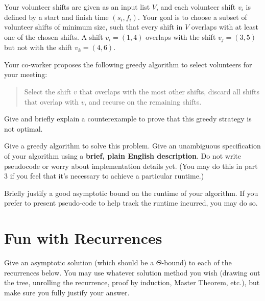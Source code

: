 \documentclass[11pt,fleqn]{exam}
\newif\ifsolutions\solutionsfalse
\begin{document}
Your volunteer shifts are given as an input list $V$, and each volunteer shift $v_i$ is defined by a start and finish time $(s_i, f_i)$. Your goal is to choose a subset of volunteer shifts of minimum size, such that every shift in $V$ overlaps with at least one of the chosen shifts. A shift $v_i=(1,4)$ overlaps with the shift $v_j=(3,5)$ but not with the shift $v_k=(4,6)$. 

\begin{questions}
\question[2] Your co-worker proposes the following greedy algorithm to select volunteers for your meeting:
\begin{quote}
    Select the shift $v$ that overlaps with the most other shifts, discard all shifts that overlap with $v$, and recurse on the remaining shifts.
\end{quote}
Give and briefly explain a counterexample to prove that this greedy strategy is not optimal.

\ifsolutions\fi 

\question[3] Give a greedy algorithm to solve this problem. Give an unambiguous specification of your algorithm using  a \textbf{brief, plain English description}. Do not write pseudocode or worry about implementation details yet. (You may do this in part 3 if you feel that it's necessary to achieve a particular runtime.)

\ifsolutions\fi 

\question[4] Briefly justify a good asymptotic bound on the runtime of your algorithm. If you prefer to present pseudo-code to help track the runtime incurred, you may do so.

\ifsolutions\fi 

\end{questions}

\clearpage
\section{Fun with Recurrences}

Give an asymptotic solution (which should be a $\Theta$-bound) to each of the recurrences below. You may use whatever solution method you wish (drawing out the tree, unrolling the recurrence, proof by induction, Master Theorem, etc.), but make sure you fully justify your answer.
	
\end{document}
